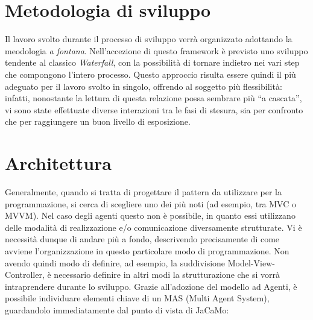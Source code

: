 \documentclass[12pt,a4paper,openright,oneside]{report}
\newcommand{\quotes}[1]{``#1''}
\begin{document}
\section{Metodologia di sviluppo}
\label{sec:Metodologia}
Il lavoro svolto durante il processo di sviluppo verrà organizzato adottando la meodologia \textit{a fontana}. Nell'accezione di questo framework è previsto uno sviluppo tendente al classico \textit{Waterfall}, con la possibilità di tornare indietro nei vari step che compongono l'intero processo. Questo approccio risulta essere quindi il più adeguato per il lavoro svolto in singolo, offrendo al soggetto più flessibilità: infatti, nonostante la lettura di questa relazione possa sembrare più \quotes{a cascata}, vi sono state effettuate diverse interazioni tra le fasi di stesura, sia per confronto che per raggiungere un buon livello di esposizione.


\section{Architettura}
\label{sec:Architettura}
Generalmente, quando si tratta di progettare il pattern da utilizzare per la programmazione, si cerca di scegliere uno dei più noti (ad esempio, tra MVC o MVVM). Nel caso degli agenti questo non è possibile, in quanto essi utilizzano delle modalità di realizzazione e/o comunicazione diversamente strutturate. Vi è necessità dunque di andare più a fondo, descrivendo precisamente di come avviene l'organizzazione in questo particolare modo di programmazione. Non avendo quindi modo di definire, ad esempio, la suddivisione Model-View-Controller, è necessario definire in altri modi la strutturazione che si vorrà intraprendere durante lo sviluppo. Grazie all'adozione del modello ad Agenti, è possibile individuare elementi chiave di un MAS (Multi Agent System), guardandolo immediatamente dal punto di vista di JaCaMo:
\end{document}
